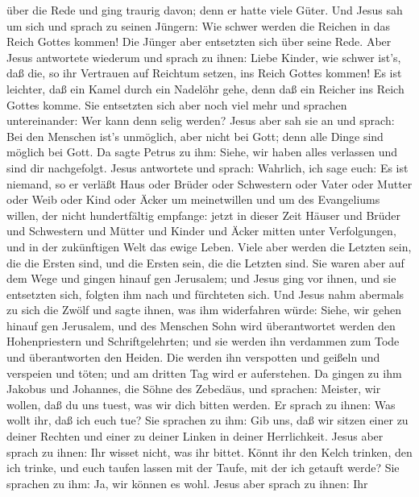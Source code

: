 über die Rede und ging traurig davon; denn er hatte viele Güter.
 Und Jesus sah um sich und sprach zu seinen Jüngern: Wie
schwer werden die Reichen in das Reich Gottes kommen!  Die
Jünger aber entsetzten sich über seine Rede. Aber Jesus antwortete
wiederum und sprach zu ihnen: Liebe Kinder, wie schwer ist's, daß die,
so ihr Vertrauen auf Reichtum setzen, ins Reich Gottes kommen!
 Es ist leichter, daß ein Kamel durch ein Nadelöhr gehe,
denn daß ein Reicher ins Reich Gottes komme.  Sie
entsetzten sich aber noch viel mehr und sprachen untereinander: Wer kann
denn selig werden?  Jesus aber sah sie an und sprach: Bei
den Menschen ist's unmöglich, aber nicht bei Gott; denn alle Dinge sind
möglich bei Gott.  Da sagte Petrus zu ihm: Siehe, wir haben
alles verlassen und sind dir nachgefolgt.  Jesus antwortete
und sprach: Wahrlich, ich sage euch: Es ist niemand, so er verläßt Haus
oder Brüder oder Schwestern oder Vater oder Mutter oder Weib oder Kind
oder Äcker um meinetwillen und um des Evangeliums willen, 
der nicht hundertfältig empfange: jetzt in dieser Zeit Häuser und Brüder
und Schwestern und Mütter und Kinder und Äcker mitten unter
Verfolgungen, und in der zukünftigen Welt das ewige Leben. 
Viele aber werden die Letzten sein, die die Ersten sind, und die Ersten
sein, die die Letzten sind.  Sie waren aber auf dem Wege
und gingen hinauf gen Jerusalem; und Jesus ging vor ihnen, und sie
entsetzten sich, folgten ihm nach und fürchteten sich. Und Jesus nahm
abermals zu sich die Zwölf und sagte ihnen, was ihm widerfahren würde:
 Siehe, wir gehen hinauf gen Jerusalem, und des Menschen
Sohn wird überantwortet werden den Hohenpriestern und Schriftgelehrten;
und sie werden ihn verdammen zum Tode und überantworten den Heiden.
 Die werden ihn verspotten und geißeln und verspeien und
töten; und am dritten Tag wird er auferstehen.  Da gingen
zu ihm Jakobus und Johannes, die Söhne des Zebedäus, und sprachen:
Meister, wir wollen, daß du uns tuest, was wir dich bitten werden.
 Er sprach zu ihnen: Was wollt ihr, daß ich euch tue?
 Sie sprachen zu ihm: Gib uns, daß wir sitzen einer zu
deiner Rechten und einer zu deiner Linken in deiner Herrlichkeit.
 Jesus aber sprach zu ihnen: Ihr wisset nicht, was ihr
bittet. Könnt ihr den Kelch trinken, den ich trinke, und euch taufen
lassen mit der Taufe, mit der ich getauft werde?  Sie
sprachen zu ihm: Ja, wir können es wohl. Jesus aber sprach zu ihnen: Ihr
